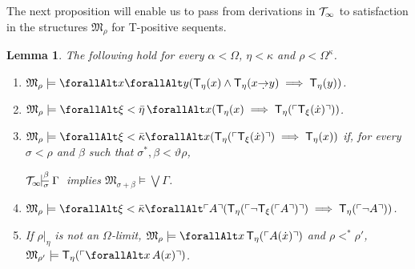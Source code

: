 \documentclass[UKenglish,cleveref,DIV=12]{scrartcl}
\let\forall\forallAlt
\newtheorem{lemma}{Lemma}
\theoremstyle{definition}
\theoremstyle{definition}
\begin{document}
The next proposition will enable us to pass from derivations in $\mathcal{T}_\infty$ to satisfaction in the structures $\mathfrak
M_{\rho}$ for T-positive sequents.
\begin{lemma}\label{extlem:T8Mprop}
 The following hold for every $\alpha<\Omega$, $\eta<\kappa$ and $\rho<\Omega^\kappa$.
 \begin{enumerate}
  \item $\mathfrak M_\rho\models\forall x\forall y( \T_\eta(x)\land
	\T_\eta(x\dimplies y) \implies \T_\eta(y))$.\label{exteqn:T8propii}
  \item $\mathfrak M_\rho\models \forall \xi<\bar\eta\,\forall
	x(\T_\eta(x)\implies \T_\eta(\gn{\T_\xi(\dot x)}))$.\label{exteqn:T8propiii}
  \item $\mathfrak M_\rho\models\forall\xi<\bar\kappa\forall
	x(\T_\eta(\gn{\T_{\xi}(\dot x)})\implies \T_\eta(x))$ if, for every
	$\sigma<\rho$ and $\beta$ such that $\sigma^*,\beta<\vartheta\rho$,
	\begin{center}
	  $\Tinfty\prov\beta\sigma\Gamma$ implies $\mathfrak M_{\sigma+\beta}\models\textstyle\bigvee\Gamma$.
	\end{center}\label{exteqn:T8propiv}
  \item $\mathfrak M_\rho\models\forall\xi<\bar\kappa\forall \gn A(\T_\eta(\gn{\lnot \T_{\xi}(\gn A)})\implies \T_\eta(\gn{\lnot A}))$.\label{exteqn:T8propv}
  \item If $\rho|_\eta$ is not an $\Omega$-limit, $\mathfrak M_\rho\models
	\forall x\,\T_\eta(\gn{A(\dot x)})$ and $\rho<^*\rho'$, $\mathfrak M_{\rho'}\models \T_\eta(\gn{\forall x\,A(x)})$.\label{exteqn:T8propvi}
 \end{enumerate}
\end{lemma}
\end{document}
